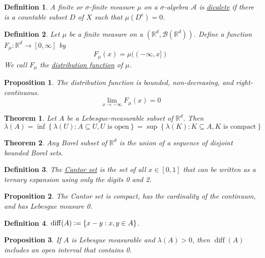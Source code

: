 \documentclass[12pt]{article}
\newtheorem{definition}{Definition}[section]
\newtheorem{proposition}{Proposition}[section]
\newtheorem{theorem}{Theorem}[section]
\begin{document}
\begin{definition}
	A finite or $\sigma$-finite measure $\mu$ on a $\sigma$-algebra $\mathcal{A}$ is \underline{dicalete} if there is a countable subset $D$ of $X$ such that $\mu(D^\mathsf{c}) = 0$.
\end{definition}

\begin{definition}
	Let $\mu$ be a finite measure on a $(\mathbb{R}^d, \mathcal{B}(\mathbb{R}^d))$. Define a function $F_\mu: \mathbb{R}^d \to [0, \infty]$ by
	$$F_\mu(x) = \mu((-\infty, x])$$
	We call $F_\mu$ the \underline{distribution function} of $\mu$.
\end{definition}
\begin{proposition}
	The distribution function is bounded, non-decreasing, and right-continuous.
	$$ \lim_{x \to -\infty} F_\mu(x) = 0$$
\end{proposition}

\begin{theorem}
	Let $A$ be a Lebesgue-measurable subset of $\mathbb{R}^d$. Then
	$$\lambda(A) = \inf\left\{\lambda(U): A \subseteq U, U \text{ is open}\right\}= \sup\left\{\lambda(K): K \subseteq A, K \text{ is compact}\right\}$$
\end{theorem}

\begin{theorem}
	Any Borel subset of $\mathbb{R}^d$ is the union of a sequence of disjoint bounded Borel sets.
\end{theorem}

\begin{definition}
	The \underline{Cantor set} is the set of all $x \in [0, 1]$ that can be written as a ternary expansion using only the digits 0 and 2.
\end{definition}
\begin{proposition}
	The Cantor set is compact, has the cardinality of the continuum, and has Lebesgue measure 0.
\end{proposition}
\begin{definition}
	$\operatorname{diff}(A)\vcentcolon= \{x - y: x, y \in A\}$.
\end{definition}
\begin{proposition}
	If $A$ is Lebesgue measurable and $\lambda (A)>0$, then $\operatorname{diff}(A)$ includes an open interval that contains 0.
\end{proposition}
\end{document}
